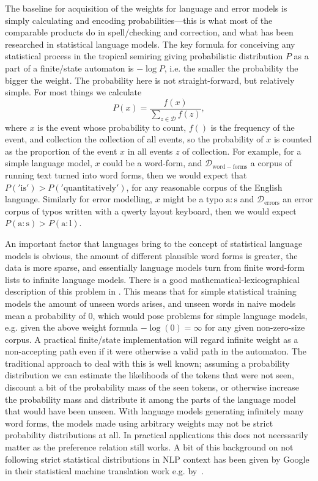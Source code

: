 \documentclass[officiallayout]{unihelcompling}
\begin{document}
The baseline for acquisition of the weights for language and error models is
simply calculating and encoding probabilities---this is what most of the
comparable products do in spell\-/checking and correction, and what has been
researched in statistical language models. The key formula for conceiving any
statistical process in the tropical semiring giving probabilistic distribution
$P$ as a part of a finite\-/state automaton is $-\log P$, i.e. the smaller the
probability the bigger the weight. The probability here is not
straight-forward, but relatively simple. For most things we calculate
\begin{equation} P(x) = \frac{f(x)}{\sum_{z \in \mathcal{D}} f(z)},
\end{equation} where $x$ is the event whose probability to count, $f()$ is the
frequency of the event, and \gls{collection} the collection of all events, so
the probability of $x$ is counted as the proportion of the event $x$ in all
events $z$ of \gls{collection}. For example, for a simple language model, $x$
could be a word-form, and $\mathcal{D}_\mathrm{word-forms}$ a corpus of running
text turned into word forms, then we would expect that $P('\mathrm{is}') >
P('\mathrm{quantitatively}')$, for any reasonable corpus of the English
language. Similarly for error modelling, $x$ might be a typo
$\mathrm{a}:\mathrm{s}$ and $\mathcal{D}_\mathrm{errors}$ an error corpus of
typos written with a qwerty layout keyboard, then we would expect
$P(\mathrm{a}:\mathrm{s}) > P(\mathrm{a}:\mathrm{l})$.

An important factor that  languages bring to the concept of
statistical language models is obvious, the amount of different plausible word
forms is greater, the data is more sparse, and essentially language models turn
from finite word-form lists to infinite language models.  There is a good
mathematical-lexicographical description of this problem in
\citet{kornai2002many}. This means that for simple statistical training models
the amount of unseen words arises, and unseen words in naive models mean a
probability of $0$, which would pose problems for simple language models, e.g.
given the above weight formula $-\log(0) = \infty$ for any given non-zero-size
corpus. A practical finite\-/state implementation will regard infinite weight
as a non-accepting path even if it were otherwise a valid path in the
automaton.  The traditional approach to deal with this is well known; assuming
a probability distribution we can estimate the likelihoods of the tokens that
were not seen, discount a bit of the probability mass of the seen tokens, or
otherwise increase the probability mass and distribute it among the parts of
the language model that would have been unseen. With language models generating
infinitely many word forms, the models made using arbitrary weights may not be
strict probability distributions at all. In practical applications this does
not necessarily matter as the preference relation still works. A bit of this
background on not following strict statistical distributions in NLP context has
been given by Google in their statistical machine translation work e.g.
by~\citet{brants2007large}.
\end{document}

